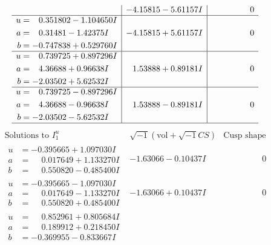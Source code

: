\documentclass[1p]{elsarticle_modified}
\theoremstyle{definition}
\newcommand{\I}{\sqrt{-1}}
\begin{document}
$$\begin{array}{c|c|c}
 & -4.15815 - 5.61157 I & \phantom{-0.000000 } 0 \\ \hline\begin{aligned}
u &= \phantom{-}0.351802 - 1.104650 I \\
a &= \phantom{-}0.31481 - 1.42375 I \\
b &= -0.747838 + 0.529760 I\end{aligned}
 & -4.15815 + 5.61157 I & \phantom{-0.000000 } 0 \\ \hline\begin{aligned}
u &= \phantom{-}0.739725 + 0.897296 I \\
a &= \phantom{-}4.36688 + 0.96638 I \\
b &= -2.03502 + 5.62532 I\end{aligned}
 & \phantom{-}1.53888 + 0.89181 I & \phantom{-0.000000 } 0 \\ \hline\begin{aligned}
u &= \phantom{-}0.739725 - 0.897296 I \\
a &= \phantom{-}4.36688 - 0.96638 I \\
b &= -2.03502 - 5.62532 I\end{aligned}
 & \phantom{-}1.53888 - 0.89181 I & \phantom{-0.000000 } 0\\
 \hline 
 \end{array}$$\newpage$$\begin{array}{c|c|c}  
\text{Solutions to }I^u_{1}& \I (\text{vol} + \sqrt{-1}CS) & \text{Cusp shape}\\
 \hline 
\begin{aligned}
u &= -0.395665 + 1.097030 I \\
a &= \phantom{-}0.017649 + 1.133270 I \\
b &= \phantom{-}0.550820 - 0.485400 I\end{aligned}
 & -1.63066 - 0.10437 I & \phantom{-0.000000 } 0 \\ \hline\begin{aligned}
u &= -0.395665 - 1.097030 I \\
a &= \phantom{-}0.017649 - 1.133270 I \\
b &= \phantom{-}0.550820 + 0.485400 I\end{aligned}
 & -1.63066 + 0.10437 I & \phantom{-0.000000 } 0 \\ \hline\begin{aligned}
u &= \phantom{-}0.852961 + 0.805684 I \\
a &= \phantom{-}0.189912 + 0.218450 I \\
b &= -0.369955 - 0.833667 I\end{aligned}

\end{array}$$
\end{document}
